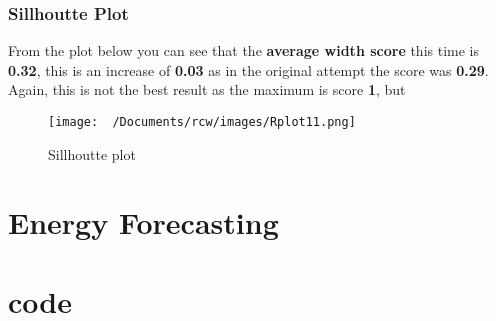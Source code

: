 \documentclass[11pt]{article}
\begin{document}
\newpage
\subsubsection{Sillhoutte Plot}

From the plot below you can see that the \textbf{average width score} this time is \textbf{0.32}, this is an increase of \textbf{0.03}
as in the original attempt the score was \textbf{0.29}. Again, this is not the best result as the maximum is score \textbf{1}, but 
\begin{figure}[H]
  \centering
  \texttt{[image: ~/Documents/rcw/images/Rplot11.png]}
  \caption{Sillhoutte plot}
\end{figure}


\section{Energy Forecasting}


\appendix

\section{code}
\end{document}
